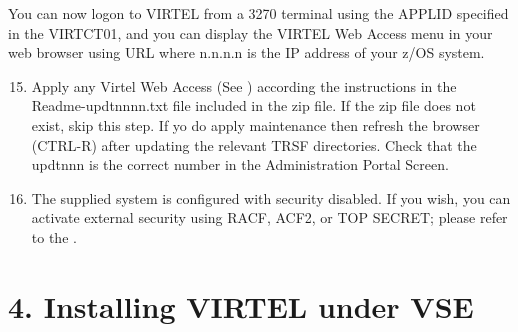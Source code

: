 \documentclass[letterpaper,10pt,english]{sphinxmanual}
\begin{document}
You can now logon to VIRTEL from a 3270 terminal using the APPLID specified in the VIRTCT01, and you can display the VIRTEL Web Access menu in your web browser using URL  where n.n.n.n is the IP address of your z/OS system.
\begin{enumerate}
\setcounter{enumi}{14}
\item {} 
Apply any Virtel Web Access (See {\hyperref[\detokenize{Installation_Guide:v457ig-bookmark02}]{}}) according the instructions in the Readme-updtnnnn.txt file included in the zip file. If the zip file does not exist, skip this step. If yo do apply maintenance then refresh the browser (CTRL-R) after updating the relevant TRSF directories. Check that the updtnnn is the correct number in the Administration Portal Screen.

\item {} 
The supplied system is configured with security disabled. If you wish, you can activate external security using RACF, ACF2, or TOP SECRET; please refer to the {\hyperref[\detokenize{Installation_Guide:v457ig-security}]{}}.

\end{enumerate}


\chapter{4. Installing VIRTEL under VSE}
\label{\detokenize{Installation_Guide:installing-virtel-under-vse}}
\end{document}
